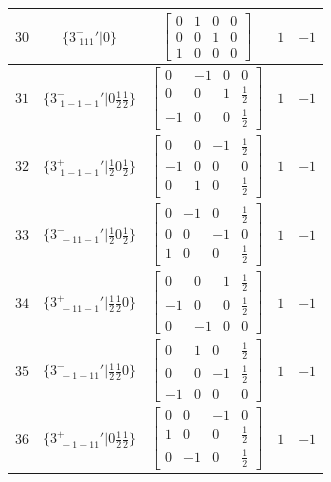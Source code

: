\documentclass[fleqn,8pt]{jsarticle}
\begin{document}
\begin{longtable}{ccccc}
$ 30 $ & $ \{3^{-}_{\,\,111}{}'|0\} $ & $ \begin{bmatrix} 0 & 1 & 0 & 0 \\ 0 & 0 & 1 & 0 \\ 1 & 0 & 0 & 0 \end{bmatrix} $ & $ 1 $ & $ -1 $ \\ \hline
$ 31 $ & $ \{3^{-}_{\,\,1-1-1}{}'|0 \frac{1}{2} \frac{1}{2}\} $ & $ \begin{bmatrix} 0 & -1 & 0 & 0 \\ 0 & 0 & 1 & \frac{1}{2} \\ -1 & 0 & 0 & \frac{1}{2} \end{bmatrix} $ & $ 1 $ & $ -1 $ \\ \hline
$ 32 $ & $ \{3^{+}_{\,\,1-1-1}{}'|\frac{1}{2} 0 \frac{1}{2}\} $ & $ \begin{bmatrix} 0 & 0 & -1 & \frac{1}{2} \\ -1 & 0 & 0 & 0 \\ 0 & 1 & 0 & \frac{1}{2} \end{bmatrix} $ & $ 1 $ & $ -1 $ \\ \hline
$ 33 $ & $ \{3^{-}_{\,\,-11-1}{}'|\frac{1}{2} 0 \frac{1}{2}\} $ & $ \begin{bmatrix} 0 & -1 & 0 & \frac{1}{2} \\ 0 & 0 & -1 & 0 \\ 1 & 0 & 0 & \frac{1}{2} \end{bmatrix} $ & $ 1 $ & $ -1 $ \\ \hline
$ 34 $ & $ \{3^{+}_{\,\,-11-1}{}'|\frac{1}{2} \frac{1}{2} 0\} $ & $ \begin{bmatrix} 0 & 0 & 1 & \frac{1}{2} \\ -1 & 0 & 0 & \frac{1}{2} \\ 0 & -1 & 0 & 0 \end{bmatrix} $ & $ 1 $ & $ -1 $ \\ \hline
$ 35 $ & $ \{3^{-}_{\,\,-1-11}{}'|\frac{1}{2} \frac{1}{2} 0\} $ & $ \begin{bmatrix} 0 & 1 & 0 & \frac{1}{2} \\ 0 & 0 & -1 & \frac{1}{2} \\ -1 & 0 & 0 & 0 \end{bmatrix} $ & $ 1 $ & $ -1 $ \\ \hline
$ 36 $ & $ \{3^{+}_{\,\,-1-11}{}'|0 \frac{1}{2} \frac{1}{2}\} $ & $ \begin{bmatrix} 0 & 0 & -1 & 0 \\ 1 & 0 & 0 & \frac{1}{2} \\ 0 & -1 & 0 & \frac{1}{2} \end{bmatrix} $ & $ 1 $ & $ -1 $ \\ \hline

\end{longtable}
\end{document}
